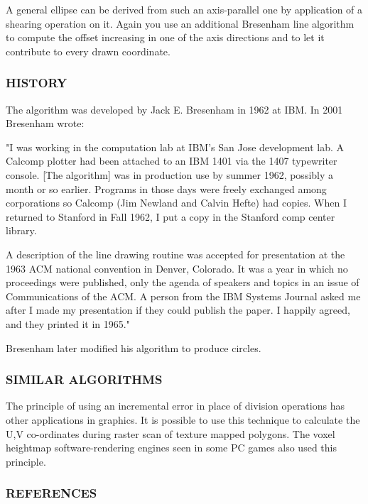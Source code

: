 A general ellipse can be derived from such an axis-\/parallel one by application of a shearing operation on it. Again you use an additional Bresenham line algorithm to compute the offset increasing in one of the axis directions and to let it contribute to every drawn coordinate.

\subsubsection*{H\+I\+S\+T\+O\+RY}

The algorithm was developed by Jack E. Bresenham in 1962 at I\+BM. In 2001 Bresenham wrote\+: \begin{DoxyVerb}"I was working in the computation lab at IBM's San Jose development lab. A Calcomp plotter had been attached to an IBM 1401 via
the 1407 typewriter console. [The algorithm] was in production use by summer 1962, possibly a month or so earlier. Programs in
those days were freely exchanged among corporations so Calcomp (Jim Newland and Calvin Hefte) had copies. When I returned to
Stanford in Fall 1962, I put a copy in the Stanford comp center library.

A description of the line drawing routine was accepted for presentation at the 1963 ACM national convention in Denver,
Colorado. It was a year in which no proceedings were published, only the agenda of speakers and topics in an issue of
Communications of the ACM. A person from the IBM Systems Journal asked me after I made my presentation if they could publish
the paper. I happily agreed, and they printed it in 1965."
\end{DoxyVerb}


Bresenham later modified his algorithm to produce circles.

\subsubsection*{S\+I\+M\+I\+L\+AR A\+L\+G\+O\+R\+I\+T\+H\+MS}

The principle of using an incremental error in place of division operations has other applications in graphics. It is possible to use this technique to calculate the U,V co-\/ordinates during raster scan of texture mapped polygons. The voxel heightmap software-\/rendering engines seen in some PC games also used this principle.

\subsubsection*{R\+E\+F\+E\+R\+E\+N\+C\+ES}


